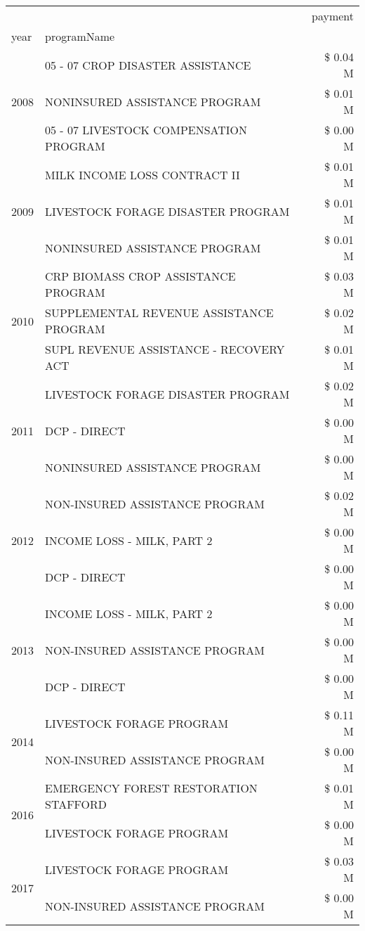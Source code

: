 \begin{tabular}{llr}
\toprule
 &  & payment \\
year & programName &  \\
\midrule
\multirow[t]{3}{*}{2008} & 05 - 07 CROP DISASTER ASSISTANCE & \$ 0.04 M \\
 & NONINSURED ASSISTANCE PROGRAM & \$ 0.01 M \\
 & 05 - 07 LIVESTOCK COMPENSATION PROGRAM & \$ 0.00 M \\
\cline{1-3}
\multirow[t]{3}{*}{2009} & MILK INCOME LOSS CONTRACT II & \$ 0.01 M \\
 & LIVESTOCK FORAGE DISASTER  PROGRAM & \$ 0.01 M \\
 & NONINSURED ASSISTANCE PROGRAM & \$ 0.01 M \\
\cline{1-3}
\multirow[t]{3}{*}{2010} & CRP BIOMASS CROP ASSISTANCE PROGRAM & \$ 0.03 M \\
 & SUPPLEMENTAL REVENUE ASSISTANCE PROGRAM & \$ 0.02 M \\
 & SUPL REVENUE ASSISTANCE - RECOVERY ACT & \$ 0.01 M \\
\cline{1-3}
\multirow[t]{3}{*}{2011} & LIVESTOCK FORAGE DISASTER PROGRAM & \$ 0.02 M \\
 & DCP - DIRECT & \$ 0.00 M \\
 & NONINSURED ASSISTANCE PROGRAM & \$ 0.00 M \\
\cline{1-3}
\multirow[t]{3}{*}{2012} & NON-INSURED ASSISTANCE PROGRAM & \$ 0.02 M \\
 & INCOME LOSS - MILK, PART 2 & \$ 0.00 M \\
 & DCP - DIRECT & \$ 0.00 M \\
\cline{1-3}
\multirow[t]{3}{*}{2013} & INCOME LOSS - MILK, PART 2 & \$ 0.00 M \\
 & NON-INSURED ASSISTANCE PROGRAM & \$ 0.00 M \\
 & DCP - DIRECT & \$ 0.00 M \\
\cline{1-3}
\multirow[t]{2}{*}{2014} & LIVESTOCK FORAGE PROGRAM & \$ 0.11 M \\
 & NON-INSURED ASSISTANCE PROGRAM & \$ 0.00 M \\
\cline{1-3}
\multirow[t]{2}{*}{2016} & EMERGENCY FOREST RESTORATION STAFFORD & \$ 0.01 M \\
 & LIVESTOCK FORAGE PROGRAM & \$ 0.00 M \\
\cline{1-3}
\multirow[t]{3}{*}{2017} & LIVESTOCK FORAGE PROGRAM & \$ 0.03 M \\
 & NON-INSURED ASSISTANCE PROGRAM & \$ 0.00 M \\

\end{tabular}
